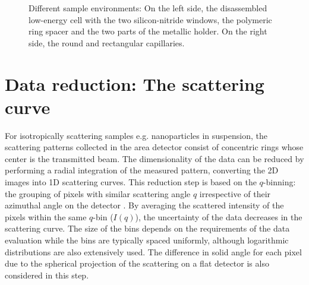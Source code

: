 \begin{figure}%
	\centering
		\caption{Different sample environments: On the left side, the disassembled low-energy cell with the two silicon-nitride windows, the polymeric ring spacer and the two parts of the metallic holder. On the right side, the round and rectangular capillaries.}
		\label{fig:SampleEnvironment}
\end{figure}

\section{Data reduction: The scattering curve}
\label{sec:data_reduction}

For isotropically scattering samples e.g. nanoparticles in suspension, the scattering patterns collected in the area detector consist of concentric rings whose center is the transmitted beam. The dimensionality of the data can be reduced by performing a radial integration of the measured pattern, converting the 2D images into 1D scattering curves. This reduction step is based on the $q$-binning: the grouping of pixels with similar scattering angle $q$ irrespective of their azimuthal angle on the detector \citep{pauw_everything_2013}. By averaging the scattered intensity of the pixels within the same $q$-bin ($I(q)$), the uncertainty of the data decreases in the scattering curve. The size of the bins depends on the requirements of the data evaluation while the bins are typically spaced uniformly, although logarithmic distributions are also extensively used. The difference in solid angle for each pixel due to the spherical projection of the scattering on a flat detector is also considered in this step.

